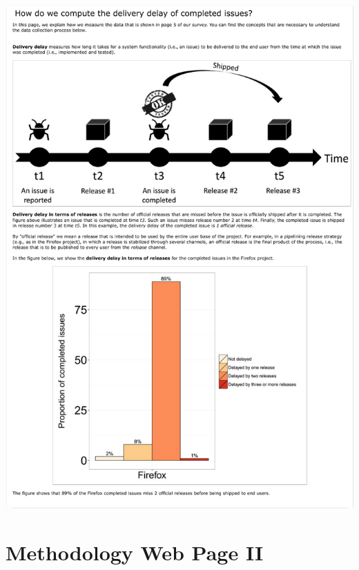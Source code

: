 \documentclass[
	12pt,				%
	openright,			%
	oneside,			%
	a4paper,			%
	french,				%
	spanish,			%
	brazil,				%
	english
	]{abntex2}
\newcounter{pt}
\newcounter{th}
\begin{document}
\begin{apendicesenv}
\includegraphics[width=.9\textwidth,keepaspectratio]{chapters/chapter5/appendix/GeneralIntegrationDelay.pdf}

\chapter{Methodology Web Page II}\label{methodology:ii}


\end{apendicesenv}
\end{document}

